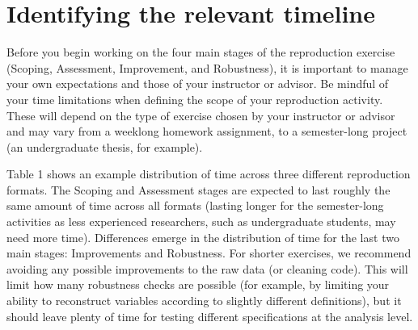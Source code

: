 \documentclass[
  openany]{book}
\begin{document}
\hypertarget{identify-timeline}{%
\section{Identifying the relevant timeline}\label{identify-timeline}}

Before you begin working on the four main stages of the reproduction exercise (Scoping, Assessment, Improvement, and Robustness), it is important to manage your own expectations and those of your instructor or advisor. Be mindful of your time limitations when defining the scope of your reproduction activity. These will depend on the type of exercise chosen by your instructor or advisor and may vary from a weeklong homework assignment, to a semester-long project (an undergraduate thesis, for example).

Table 1 shows an example distribution of time across three different reproduction formats. The Scoping and Assessment stages are expected to last roughly the same amount of time across all formats (lasting longer for the semester-long activities as less experienced researchers, such as undergraduate students, may need more time). Differences emerge in the distribution of time for the last two main stages: Improvements and Robustness. For shorter exercises, we recommend avoiding any possible improvements to the raw data (or cleaning code). This will limit how many robustness checks are possible (for example, by limiting your ability to reconstruct variables according to slightly different definitions), but it should leave plenty of time for testing different specifications at the analysis level.
\end{document}
